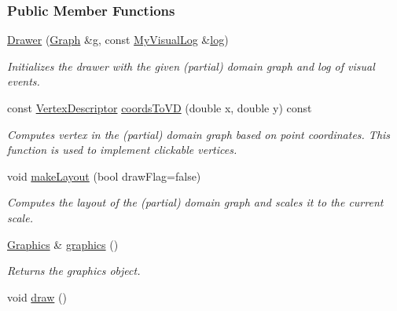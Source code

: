 \subsubsection*{Public Member Functions}
\begin{DoxyCompactItemize}
\item 
\hyperlink{structDrawer_a72a2f72e0132189a808ce21333695c3b}{Drawer} (\hyperlink{structDrawer_a2a65d4731ffb3bcf0102e830a831e575}{Graph} \&g, const \hyperlink{structDrawer_a92e48b34c17108cc5a5a66ab84ad648b}{My\+Visual\+Log} \&\hyperlink{algorithm__log_8h_a56be41e5d18609f6adf769e9c49804da}{log})\hypertarget{structDrawer_a72a2f72e0132189a808ce21333695c3b}{}\label{structDrawer_a72a2f72e0132189a808ce21333695c3b}

\begin{DoxyCompactList}\small\item\em Initializes the drawer with the given (partial) domain graph and log of visual events. \end{DoxyCompactList}\item 
const \hyperlink{structDrawer_a5bccdf5b5e846fb1a958dca6b5f0a1f6}{Vertex\+Descriptor} \hyperlink{structDrawer_a6f150f3851e48763b22e38da305fa046}{coords\+To\+VD} (double x, double y) const 
\begin{DoxyCompactList}\small\item\em Computes vertex in the (partial) domain graph based on point coordinates. This function is used to implement clickable vertices. \end{DoxyCompactList}\item 
void \hyperlink{structDrawer_ac8835ed2848df7b5e625863ab7b702a3}{make\+Layout} (bool draw\+Flag=false)
\begin{DoxyCompactList}\small\item\em Computes the layout of the (partial) domain graph and scales it to the current scale. \end{DoxyCompactList}\item 
\hyperlink{structGraphics}{Graphics} \& \hyperlink{structDrawer_a386495daac9db1d050b090cd6fcbabbc}{graphics} ()
\begin{DoxyCompactList}\small\item\em Returns the graphics object. \end{DoxyCompactList}\item 
void \hyperlink{structDrawer_ab166935e37b498932d8f166322851b65}{draw} ()\hypertarget{structDrawer_ab166935e37b498932d8f166322851b65}{}\label{structDrawer_ab166935e37b498932d8f166322851b65}


\end{DoxyCompactItemize}
